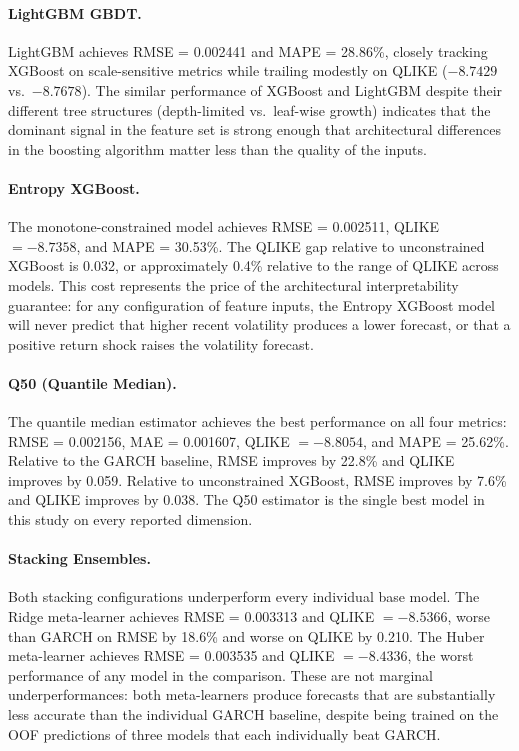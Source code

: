 \documentclass[12pt]{article}
\begin{document}
\paragraph{LightGBM GBDT.}
LightGBM achieves RMSE = 0.002441 and MAPE = 28.86\%, closely tracking
XGBoost on scale-sensitive metrics while trailing modestly on QLIKE
($-8.7429$ vs.\ $-8.7678$).  The similar performance of XGBoost and LightGBM
despite their different tree structures (depth-limited vs.\ leaf-wise growth)
indicates that the dominant signal in the feature set is strong enough that
architectural differences in the boosting algorithm matter less than the
quality of the inputs.

\paragraph{Entropy XGBoost.}
The monotone-constrained model achieves RMSE = 0.002511, QLIKE $= -8.7358$,
and MAPE = 30.53\%.  The QLIKE gap relative to unconstrained XGBoost is 0.032,
or approximately 0.4\% relative to the range of QLIKE across models.  This
cost represents the price of the architectural interpretability guarantee:
for any configuration of feature inputs, the Entropy XGBoost model will
never predict that higher recent volatility produces a lower forecast, or that
a positive return shock raises the volatility forecast.

\paragraph{Q50 (Quantile Median).}
The quantile median estimator achieves the best performance on all four
metrics: RMSE = 0.002156, MAE = 0.001607, QLIKE $= -8.8054$, and MAPE =
25.62\%.  Relative to the GARCH baseline, RMSE improves by 22.8\% and QLIKE
improves by 0.059.  Relative to unconstrained XGBoost, RMSE improves by 7.6\%
and QLIKE improves by 0.038.  The Q50 estimator is the single best model in
this study on every reported dimension.

\paragraph{Stacking Ensembles.}
Both stacking configurations underperform every individual base model.  The
Ridge meta-learner achieves RMSE = 0.003313 and QLIKE $= -8.5366$, worse than
GARCH on RMSE by 18.6\% and worse on QLIKE by 0.210.  The Huber meta-learner
achieves RMSE = 0.003535 and QLIKE $= -8.4336$, the worst performance of any
model in the comparison.  These are not marginal underperformances: both
meta-learners produce forecasts that are substantially less accurate than the
individual GARCH baseline, despite being trained on the OOF predictions of
three models that each individually beat GARCH.
\end{document}
